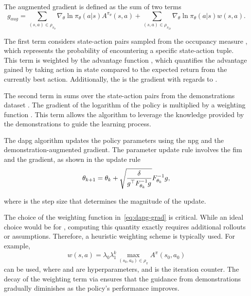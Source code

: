 The augmented gradient  is defined as the sum of two terms
%
\begin{equation} \label{eq:dapg-grad}
	g_{aug} = \sum_{(s,a)\in\rho_{\pi_\theta}}\nabla_\theta \ln \pi_\theta(a|s)A^{\pi_\theta}(s,a) + \sum_{(s,a)\in\rho_{\pi_D}} \nabla_\theta \ln \pi_\theta(a|s) w(s,a).
\end{equation}

The first term considers state-action pairs  sampled from the occupancy measure \mvar{\rho_{\pi}}, which represents the probability of encountering a specific state-action tuple. This term is weighted by the advantage function , which quantifies the advantage gained by taking action  in state  compared to the expected return from the currently best action. Additionally, the \mvar{\nabla_\theta} is the gradient with regards to \mvar{\theta}.\medskip

The second term in  sums over the state-action pairs  from the demonstrations dataset . The gradient of the logarithm of the policy  is multiplied by a weighting function . This term allows the algorithm to leverage the knowledge provided by the demonstrations to guide the learning process. \medskip

The \gls{dapg} algorithm updates the policy parameters \mvar{\theta} using the \gls{npg} and the demonstration-augmented gradient. The parameter update rule involves the \gls{fim} and the gradient, as shown in the update rule
%
\begin{equation}
	\theta_{k+1} = \theta_k + \sqrt{\frac{\delta}{g^\top F^{-1}_{\theta_k}g}}F^{-1}_{\theta_k}g,
\end{equation}

where \mvar{\delta} is the step size that determines the magnitude of the update. \medskip

The choice of the weighting function  in~\eqref{eq:dapg-grad} is critical. While an ideal choice would be  for , computing this quantity exactly requires additional rollouts or assumptions. Therefore, a heuristic weighting scheme is typically used. For example, 
%
\begin{equation}
	w(s, a) = \lambda_0 \lambda_1^k \max_{(s_0, a_0) \in \rho_{\pi}} A^{\pi}(s_0, a_0)
\end{equation}
can be used, where  and  are hyperparameters, and  is the iteration counter. The decay of the weighting term via  ensures that the guidance from demonstrations gradually diminishes as the policy's performance improves. \medskip

